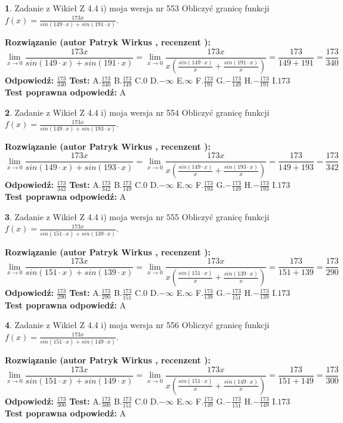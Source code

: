\documentclass[12pt, a4paper]{article}
\theoremstyle{definition} %
\newtheorem{zad}{}
\newcommand{\zadStart}[1]{\begin{zad}#1\newline}
\newcommand{\zadStop}{\end{zad}}
\newcommand{\rozwStart}[2]{\noindent \textbf{Rozwiązanie (autor #1 , recenzent #2): }\newline}
\newcommand{\rozwStop}{\newline}
\newcommand{\odpStart}{\noindent \textbf{Odpowiedź:}\newline}
\newcommand{\odpStop}{\newline}
\newcommand{\testStart}{\noindent \textbf{Test:}\newline}
\newcommand{\testStop}{\newline}
\newcommand{\kluczStart}{\noindent \textbf{Test poprawna odpowiedź:}\newline}
\newcommand{\kluczStop}{\newline}
\begin{document}
\zadStart{Zadanie z Wikieł Z 4.4 i) moja wersja nr 553}
Obliczyć granicę funkcji $f(x)=\frac{173x}{sin(149\cdot x) +sin(191\cdot x)}$.
\zadStop
\rozwStart{Patryk Wirkus}{}
$$\lim\limits_{x\to 0}\frac{173x}{sin(149\cdot x) +sin(191\cdot x)}=\lim\limits_{x\to 0}\frac{173x}{x(\frac{sin(149\cdot x)}{x}+\frac{sin(191\cdot x)}{x})}=\frac{173}{149+191} = \frac{173}{340}$$
\rozwStop
\odpStart
$\frac{173}{340}$
\odpStop
\testStart
A.$\frac{173}{340}$
B.$\frac{173}{149}$
C.$0$
D.$-\infty$
E.$\infty$
F.$\frac{173}{191}$
G.$-\frac{173}{149}$
H.$-\frac{173}{191}$
I.$173$
\testStop
\kluczStart
A
\kluczStop



\zadStart{Zadanie z Wikieł Z 4.4 i) moja wersja nr 554}
Obliczyć granicę funkcji $f(x)=\frac{173x}{sin(149\cdot x) +sin(193\cdot x)}$.
\zadStop
\rozwStart{Patryk Wirkus}{}
$$\lim\limits_{x\to 0}\frac{173x}{sin(149\cdot x) +sin(193\cdot x)}=\lim\limits_{x\to 0}\frac{173x}{x(\frac{sin(149\cdot x)}{x}+\frac{sin(193\cdot x)}{x})}=\frac{173}{149+193} = \frac{173}{342}$$
\rozwStop
\odpStart
$\frac{173}{342}$
\odpStop
\testStart
A.$\frac{173}{342}$
B.$\frac{173}{149}$
C.$0$
D.$-\infty$
E.$\infty$
F.$\frac{173}{193}$
G.$-\frac{173}{149}$
H.$-\frac{173}{193}$
I.$173$
\testStop
\kluczStart
A
\kluczStop



\zadStart{Zadanie z Wikieł Z 4.4 i) moja wersja nr 555}
Obliczyć granicę funkcji $f(x)=\frac{173x}{sin(151\cdot x) +sin(139\cdot x)}$.
\zadStop
\rozwStart{Patryk Wirkus}{}
$$\lim\limits_{x\to 0}\frac{173x}{sin(151\cdot x) +sin(139\cdot x)}=\lim\limits_{x\to 0}\frac{173x}{x(\frac{sin(151\cdot x)}{x}+\frac{sin(139\cdot x)}{x})}=\frac{173}{151+139} = \frac{173}{290}$$
\rozwStop
\odpStart
$\frac{173}{290}$
\odpStop
\testStart
A.$\frac{173}{290}$
B.$\frac{173}{151}$
C.$0$
D.$-\infty$
E.$\infty$
F.$\frac{173}{139}$
G.$-\frac{173}{151}$
H.$-\frac{173}{139}$
I.$173$
\testStop
\kluczStart
A
\kluczStop



\zadStart{Zadanie z Wikieł Z 4.4 i) moja wersja nr 556}
Obliczyć granicę funkcji $f(x)=\frac{173x}{sin(151\cdot x) +sin(149\cdot x)}$.
\zadStop
\rozwStart{Patryk Wirkus}{}
$$\lim\limits_{x\to 0}\frac{173x}{sin(151\cdot x) +sin(149\cdot x)}=\lim\limits_{x\to 0}\frac{173x}{x(\frac{sin(151\cdot x)}{x}+\frac{sin(149\cdot x)}{x})}=\frac{173}{151+149} = \frac{173}{300}$$
\rozwStop
\odpStart
$\frac{173}{300}$
\odpStop
\testStart
A.$\frac{173}{300}$
B.$\frac{173}{151}$
C.$0$
D.$-\infty$
E.$\infty$
F.$\frac{173}{149}$
G.$-\frac{173}{151}$
H.$-\frac{173}{149}$
I.$173$
\testStop
\kluczStart
A
\kluczStop
\end{document}
